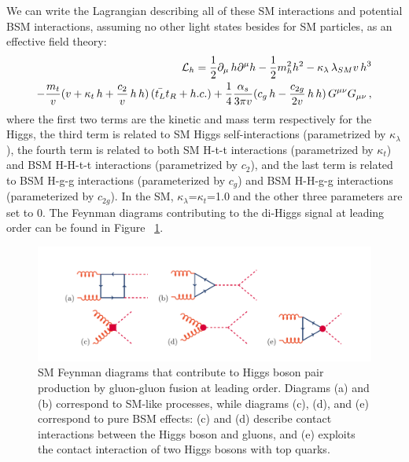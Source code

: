 We can write the Lagrangian describing all of these SM interactions and potential BSM interactions, assuming no other light states besides for SM particles, as an effective field theory:
\begin{eqnarray}
{\cal L}_h = 
\frac{1}{2} \partial_{\mu}\, h \partial^{\mu} h - \frac{1}{2} m_h^2 h^2 -
  {\kappa_{\lambda}}\,  \lambda_{SM} v\, h^3 \nonumber  \\ 
- \frac{ m_t}{v}(v+   {\kappa_t} \,   h  +  \frac{c_{2}}{v}   \, h\,  h ) \,( \bar{t_L}t_R + h.c.) 
+ \frac{1}{4} \frac{\alpha_s}{3 \pi v} (   c_g \, h -  \frac{c_{2g}}{2 v} \, h\, h ) \,  G^{\mu \nu}G_{\mu\nu}\,,
\label{eq:lag}
\end{eqnarray}
where the first two terms are the kinetic and mass term respectively for the Higgs, the third term is related to SM Higgs self-interactions (parametrized by $\kappa_{\lambda}$), the fourth term is related to both SM H-t-t interactions (parametrized by $\kappa_{t}$) and BSM H-H-t-t interactions (parametrized by $c_2$), and the last term is related to BSM H-g-g interactions (parameterized by $c_g$) and BSM H-H-g-g interactions (parameterized by $c_{2g}$). In the SM, $\kappa_{\lambda}$=$\kappa_{t}$=1.0 and the other three parameters are set to 0. The Feynman diagrams contributing to the di-Higgs signal at leading order can be found in Figure ~\ref{fig:dia}.
\begin{figure}[h]
\centering
\includegraphics[scale=0.85]{F2/translation.pdf}
\caption{SM Feynman diagrams that contribute to Higgs boson pair production by gluon-gluon fusion at leading order. Diagrams (a) and (b) correspond to SM-like processes, while diagrams (c), (d), and (e) correspond to pure BSM effects: (c) and (d) describe contact interactions between the Higgs boson and gluons, and (e) exploits the contact interaction of two Higgs bosons with top quarks.   \label{fig:dia}}
\end{figure}

